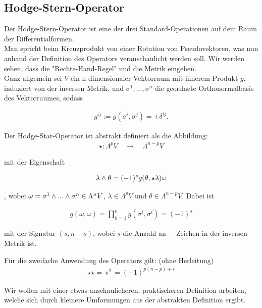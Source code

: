 \subsection{Hodge-Stern-Operator}
Der Hodge-Stern-Operator ist eine der drei Standard-Operationen auf dem Raum der Differentialformen. \\
Man spricht beim Kreuzprodukt von einer Rotation von Pseudovektoren, was nun anhand der Definition des Operators veranschaulicht werden soll. Wir werden sehen, dass die "Rechte-Hand-Regel" und die Metrik eingehen. \\
Ganz allgemein sei $V$ ein n-dimensionaler Vektorraum mit innerem Produkt $g$, induziert von der inversen Metrik, und ${\sigma^1, ..., \sigma^n}$ die geordnete Orthonormalbasis des Vektorraumes, sodass

\begin{align*}
g^{i j} := g(\sigma^{i},\sigma^{j}) = \pm \delta^{i j}.
\end{align*}


Der Hodge-Star-Operator ist abstrakt definiert als die Abbildung:
\begin{align*}
\star : \Lambda^p V \quad \rightarrow \quad  \Lambda^{n-p} V 
\end{align*}

mit der Eigenschaft

\begin{align}
\lambda \wedge \theta = (-1)^s g(\theta,\star\lambda) \omega
\end{align}

, wobei $\omega = \sigma^1 \wedge ... \wedge \sigma^n \in \Lambda^n V$, $\lambda \in \Lambda^p V$ und $\theta \in \Lambda^{n-p} V$. Dabei ist

 \begin{align}
 g(\omega,\omega) = \prod_{k=1}^{n} g(\sigma^{i},\sigma^{i}) = (-1)^s
 \end{align}
 
mit der Signatur $(s,n-s)$, wobei $s$ die Anzahl an $-$-Zeichen in der inversen Metrik ist.

 Für die zweifache Anwendung des Operators gilt: (ohne Herleitung)
 \begin{align}
 \star \star = \star^2 = (-1)^{p(n-p)+s}
 \end{align}
 
Wir wollen mit einer etwas anschaulicheren, praktischeren Definition arbeiten, welche sich durch kleinere Umformungen aus der abstrakten Definition ergibt. \\

